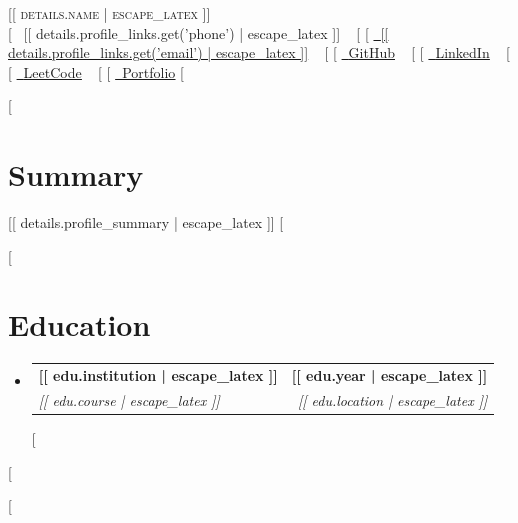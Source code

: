 \documentclass[letterpaper,11pt]{article}
\makeatletter
\newcommand{\resumeSubheading}[4]{
  \vspace{-2pt}\item
    \begin{tabular*}{1.0\textwidth}[t]{l@{\extracolsep{\fill}}r}
      \textbf{#1} & \textbf{\small #2} \\
      \textit{\small#3} & \textit{\small #4} \\
    \end{tabular*}\vspace{-7pt}
}
\newcommand{\resumeSubHeadingListStart}{\begin{itemize}[leftmargin=0.0in, label={}]}
\newcommand{\resumeSubHeadingListEnd}{\end{itemize}}
\makeatother
\begin{document}
\begin{center}
    {\Huge \scshape [[ details.name | escape_latex ]]} \\ \vspace{1pt}
    \small 
    [%
    \raisebox{-0.1\height}\faPhone\ [[ details.profile_links.get('phone') | escape_latex ]] ~
    [%
    [%
    \href{mailto:[[ details.profile_links.get('email') | escape_latex ]]}{\raisebox{-0.2\height}\faEnvelope\ \underline{[[ details.profile_links.get('email') | escape_latex ]]}} ~
    [%
    [%
    \href{[[ details.profile_links.get('github') | escape_latex ]]}{\raisebox{-0.2\height}\faGithub\ \underline{GitHub}} ~
    [%
    [%
    \href{[[ details.profile_links.get('linkedin') | escape_latex ]]}{\raisebox{-0.2\height}\faLinkedin\ \underline{LinkedIn}} ~
    [%
    [%
    \href{[[ details.profile_links.get('leetcode') | escape_latex ]]}{\raisebox{-0.2\height}\faCode\ \underline{LeetCode}} ~
    [%
    [%
    \href{[[ details.profile_links.get('portfolio') | escape_latex ]]}{\raisebox{-0.2\height}\faGlobe\ \underline{Portfolio}}
    [%
    \vspace{-8pt}
\end{center}

[%
\section{Summary}
\small [[ details.profile_summary | escape_latex ]]
\vspace{-10pt}
[%

[%
\section{Education}
  \resumeSubHeadingListStart
    [%
    \resumeSubheading
      {[[ edu.institution | escape_latex ]]}{[[ edu.year | escape_latex ]]}
      {[[ edu.course | escape_latex ]]}{[[ edu.location | escape_latex ]]}
    [%
  \resumeSubHeadingListEnd
[%

[%
\end{document}
